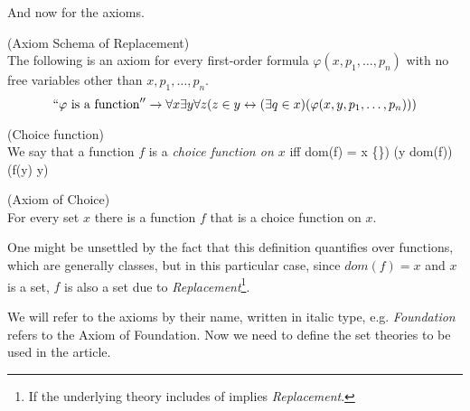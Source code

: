 And now for the axioms.

\begin{definition}{(Axiom Schema of Replacement)}\label{def:replacement}\\
The following is an axiom for every first-order formula $\varphi(x, p_1, \ldots, p_n)$ with no free variables other than $x, p_1, \ldots, p_n$.
\begin{equation}
``\varphi\mbox{ is a function}''\rightarrow \forall x \exists y \forall z (z \in y \leftrightarrow (\exists q \in x)(\varphi(x, y, p_1, \ldots, p_n)))
\end{equation}
\end{definition}

\begin{definition}{(Choice function)}\label{def:choice_function}\\
We say that a function $f$ is a \emph{choice function on $x$} iff
\beq
dom(f) = x \setminus \{\emptyset\}) \et (\forall y \in dom(f))(f(y) \in y)
\eeq
\end{definition}


\begin{definition}{(Axiom of Choice)}\label{def:choice}\\
For every set $x$ there is a function $f$ that is a choice function on $x$.
\end{definition}
One might be unsettled by the fact that this definition quantifies over functions, which are generally classes, but in this particular case, since $dom(f) = x$ and $x$ is a set, $f$ is also a set due to \emph{Replacement}\footnote{If the underlying theory includes of implies \emph{Replacement}.}.%

We will refer to the axioms by their name, written in italic type, e.g. \emph{Foundation} refers to the Axiom of Foundation. Now we need to define the set theories to be used in the article. 

